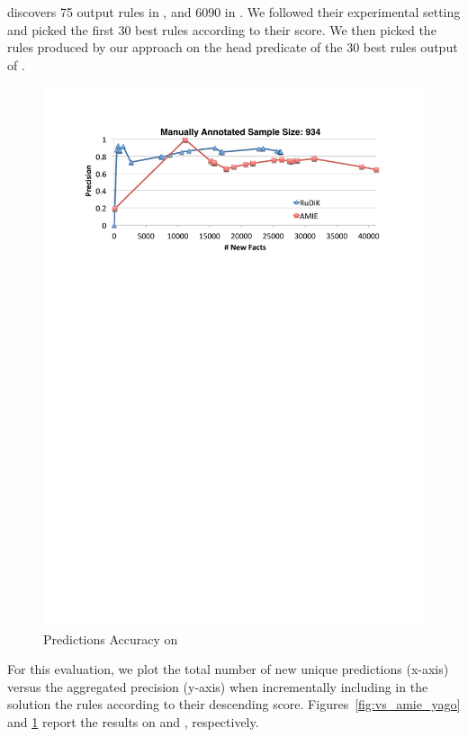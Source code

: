 \amie discovers 
75 output rules in \yago, and 6090 in \dbpedia. We followed their experimental setting and picked the first 30 best rules according to their score. We then picked the rules produced by our approach on the head predicate of the 30 best rules output of \amie. 

\begin{figure}[t]
	\centering
	\includegraphics[width=.9\columnwidth]{include/figure/vsAmieDBPedia.pdf}
	\vspace{-1ex}
	\caption{Predictions Accuracy on \dbpedia}
	\label{fig:vs_amie_dbpedia}
\end{figure}

For this evaluation, we plot the total number of new unique predictions (x-axis) versus the aggregated precision (y-axis) when incrementally including in the solution the rules according to their descending score. Figures~\ref{fig:vs_amie_yago} and \ref{fig:vs_amie_dbpedia} report the results
on \yago and \dbpedia, respectively. 

